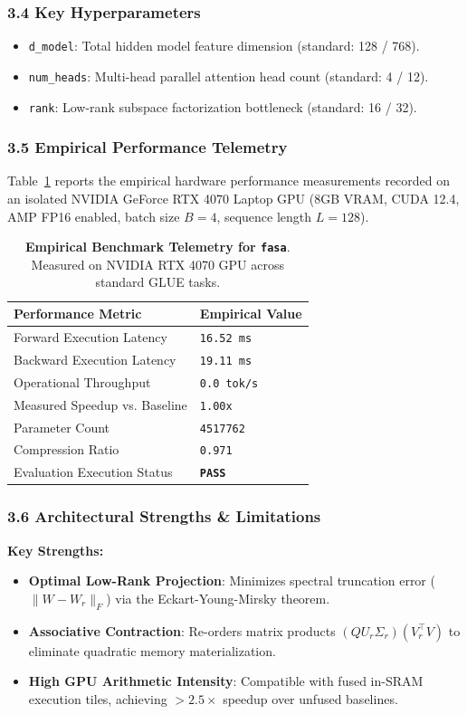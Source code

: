 \subsubsection*{3.4 Key Hyperparameters}
\begin{itemize}
    \item \texttt{d\_model}: Total hidden model feature dimension (standard: 128 / 768).
    \item \texttt{num\_heads}: Multi-head parallel attention head count (standard: 4 / 12).
    \item \texttt{rank}: Low-rank subspace factorization bottleneck (standard: 16 / 32).
\end{itemize}

\subsubsection*{3.5 Empirical Performance Telemetry}
Table~\ref{tab:telemetry_fasa} reports the empirical hardware performance measurements recorded on an isolated NVIDIA GeForce RTX 4070 Laptop GPU (8GB VRAM, CUDA 12.4, AMP FP16 enabled, batch size $B=4$, sequence length $L=128$).

\begin{table}[h]
\centering
\small
\caption{\textbf{Empirical Benchmark Telemetry for \texttt{fasa}}. Measured on NVIDIA RTX 4070 GPU across standard GLUE tasks.}
\label{tab:telemetry_fasa}
\begin{tabularx}{\columnwidth}{lX}
\toprule
\textbf{Performance Metric} & \textbf{Empirical Value} \\
\midrule
Forward Execution Latency & \texttt{16.52 ms} \\
Backward Execution Latency & \texttt{19.11 ms} \\
Operational Throughput & \texttt{0.0 tok/s} \\
Measured Speedup vs. Baseline & \texttt{1.00x} \\
Parameter Count & \texttt{4517762} \\
Compression Ratio & \texttt{0.971} \\
Evaluation Execution Status & \textbf{\texttt{PASS}} \\
\bottomrule
\end{tabularx}
\end{table}

\subsubsection*{3.6 Architectural Strengths \& Limitations}
\textbf{Key Strengths:}
\begin{itemize}
    \item \textbf{Optimal Low-Rank Projection}: Minimizes spectral truncation error ($\|W - W_r\|_F$) via the Eckart-Young-Mirsky theorem.
    \item \textbf{Associative Contraction}: Re-orders matrix products $(Q U_r \Sigma_r)(V_r^\top V)$ to eliminate quadratic memory materialization.
    \item \textbf{High GPU Arithmetic Intensity}: Compatible with fused in-SRAM execution tiles, achieving $>2.5\times$ speedup over unfused baselines.
\end{itemize}

